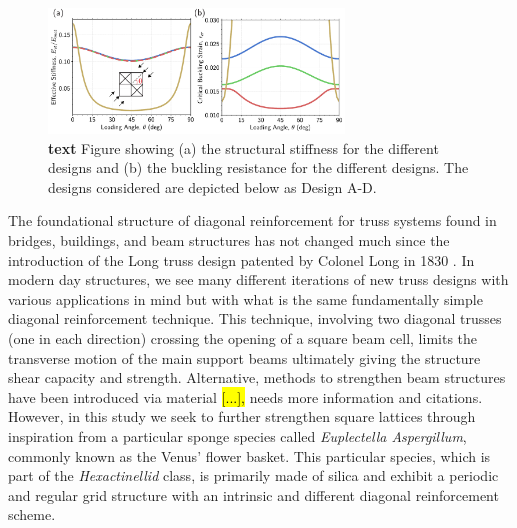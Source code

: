 \documentclass[9pt,twocolumn,twoside]{fernandes_paper}
\newcommand{\mf}[1]{\colorbox{blue!10}{\color{color3}#1}}
\begin{document}
\begin{figure}[ht]
	\captionsetup{width=0.8\textwidth}
	\begin{center}
		\includegraphics[width=0.7\textwidth]{Fig3}
	\end{center}
	\caption{\textbf{text} Figure showing (a) the structural stiffness for the different designs and (b) the buckling resistance for the different designs. The designs considered are depicted below as Design A-D.} \label{Fig3}
\end{figure}




The foundational structure of diagonal reinforcement for truss systems found in bridges, buildings, and beam structures has not changed much since the introduction of the Long truss design patented by Colonel Long in 1830 \citep{waddell1916}. In modern day structures, we see many different iterations of new truss designs with various applications in mind but with what is the same fundamentally simple diagonal reinforcement technique. This technique, involving two diagonal trusses (one in each direction) crossing the opening of a square beam cell, limits the transverse motion of the main support beams ultimately giving the structure shear capacity and strength. Alternative, methods to strengthen beam structures have been introduced via material \hl{[...],} \mf{needs more information and citations}. However, in this study we seek to further strengthen square lattices through inspiration from a particular sponge species called \textit{Euplectella Aspergillum}, commonly known as the Venus' flower basket. This particular species, which is part of the \textit{Hexactinellid} class, is primarily made of silica and exhibit a periodic and regular grid structure with an intrinsic and different diagonal reinforcement scheme. 
\end{document}
